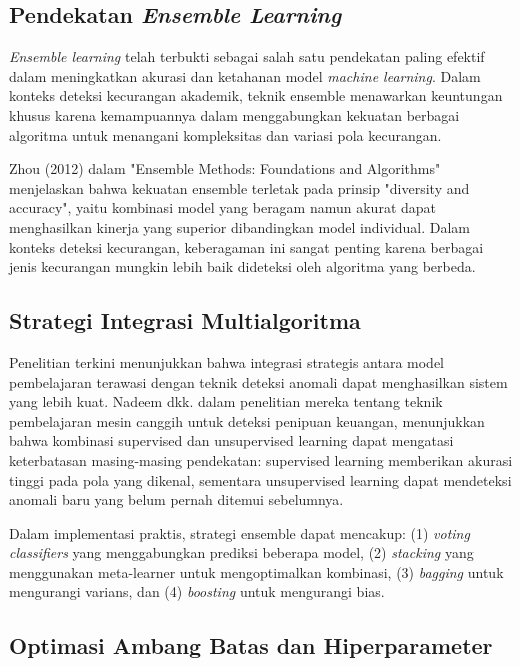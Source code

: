 \subsection{Pendekatan \textit{Ensemble Learning}}

\textit{Ensemble learning} telah terbukti sebagai salah satu pendekatan paling efektif dalam meningkatkan akurasi dan ketahanan model \textit{machine learning}. Dalam konteks deteksi kecurangan akademik, teknik ensemble menawarkan keuntungan khusus karena kemampuannya dalam menggabungkan kekuatan berbagai algoritma untuk menangani kompleksitas dan variasi pola kecurangan.

Zhou (2012) dalam "Ensemble Methods: Foundations and Algorithms" menjelaskan bahwa kekuatan ensemble terletak pada prinsip "diversity and accuracy", yaitu kombinasi model yang beragam namun akurat dapat menghasilkan kinerja yang superior dibandingkan model individual. Dalam konteks deteksi kecurangan, keberagaman ini sangat penting karena berbagai jenis kecurangan mungkin lebih baik dideteksi oleh algoritma yang berbeda.

\subsection{Strategi Integrasi Multialgoritma}

Penelitian terkini menunjukkan bahwa integrasi strategis antara model pembelajaran terawasi dengan teknik deteksi anomali dapat menghasilkan sistem yang lebih kuat. Nadeem dkk. \cite{Nadeem2024} dalam penelitian mereka tentang teknik pembelajaran mesin canggih untuk deteksi penipuan keuangan, menunjukkan bahwa kombinasi supervised dan unsupervised learning dapat mengatasi keterbatasan masing-masing pendekatan: supervised learning memberikan akurasi tinggi pada pola yang dikenal, sementara unsupervised learning dapat mendeteksi anomali baru yang belum pernah ditemui sebelumnya.

Dalam implementasi praktis, strategi ensemble dapat mencakup: (1) \textit{voting classifiers} yang menggabungkan prediksi beberapa model, (2) \textit{stacking} yang menggunakan meta-learner untuk mengoptimalkan kombinasi, (3) \textit{bagging} untuk mengurangi varians, dan (4) \textit{boosting} untuk mengurangi bias.

\subsection{Optimasi Ambang Batas dan Hiperparameter}

